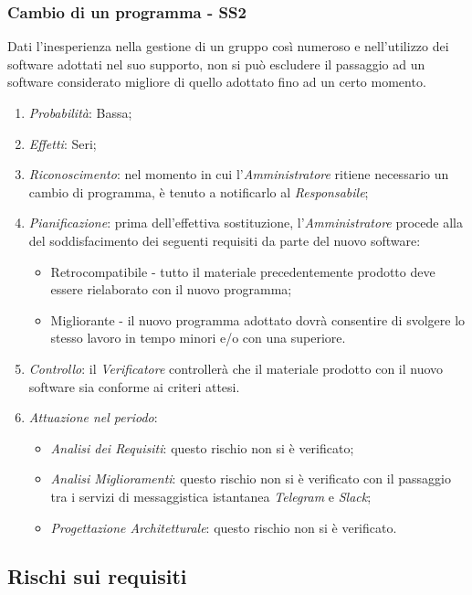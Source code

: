 \subsubsection{Cambio di un programma - SS2}
Dati l'inesperienza nella gestione di un gruppo cos\`i numeroso e nell'utilizzo dei software adottati nel suo supporto, non si pu\`o escludere il passaggio ad un software considerato migliore di quello adottato fino ad un certo momento.
\begin{enumerate}
\item \textit{Probabilit\`a}: Bassa;
\item \textit{Effetti}: Seri;
\item \textit{Riconoscimento}: nel momento in cui l'\textit{Amministratore} ritiene necessario un cambio di programma, è tenuto a notificarlo al \textit{Responsabile};
\item \textit{Pianificazione}: prima dell'effettiva sostituzione, l'\textit{Amministratore} procede alla  del soddisfacimento dei seguenti requisiti da parte del nuovo software:
  \begin{itemize}
    \item Retrocompatibile - tutto il materiale precedentemente prodotto deve essere rielaborato con il nuovo programma;
    \item Migliorante - il nuovo programma adottato dovr\`a consentire di svolgere lo stesso lavoro in tempo minori e/o con una  superiore.
  \end{itemize}
\item \textit{Controllo}: il \textit{Verificatore} controller\`a che il materiale prodotto con il nuovo software sia conforme ai criteri attesi.
\item \textit{Attuazione nel periodo}: 
	\begin{itemize}
	\item \textit{Analisi dei Requisiti}: questo rischio non si è verificato;
	\item \textit{Analisi Miglioramenti}: questo rischio non si è verificato con il passaggio tra i servizi di messaggistica istantanea \textit{Telegram} e \textit{Slack};
	\item \textit{Progettazione Architetturale}: questo rischio non si è verificato.
	\end{itemize}
\end{enumerate}

\subsection{Rischi sui requisiti}
